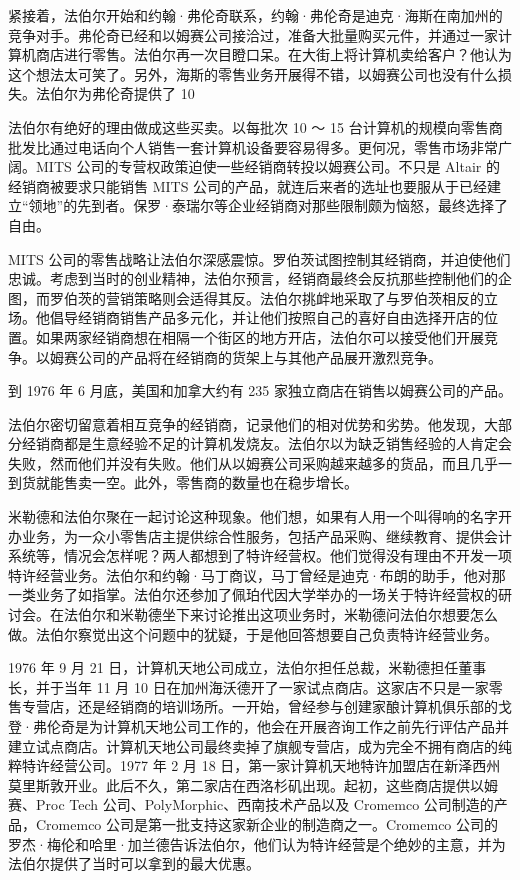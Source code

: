 \documentclass[12pt,UTF8]{ctexbook}
\begin{document}
紧接着，法伯尔开始和约翰·弗伦奇联系，约翰·弗伦奇是迪克·海斯在南加州的竞争对手。弗伦奇已经和以姆赛公司接洽过，准备大批量购买元件，并通过一家计算机商店进行零售。法伯尔再一次目瞪口呆。在大街上将计算机卖给客户？他认为这个想法太可笑了。另外，海斯的零售业务开展得不错，以姆赛公司也没有什么损失。法伯尔为弗伦奇提供了 10%

法伯尔有绝好的理由做成这些买卖。以每批次 10 ～ 15 台计算机的规模向零售商批发比通过电话向个人销售一套计算机设备要容易得多。更何况，零售市场非常广阔。MITS 公司的专营权政策迫使一些经销商转投以姆赛公司。不只是 Altair 的经销商被要求只能销售 MITS 公司的产品，就连后来者的选址也要服从于已经建立“领地”的先到者。保罗·泰瑞尔等企业经销商对那些限制颇为恼怒，最终选择了自由。

MITS 公司的零售战略让法伯尔深感震惊。罗伯茨试图控制其经销商，并迫使他们忠诚。考虑到当时的创业精神，法伯尔预言，经销商最终会反抗那些控制他们的企图，而罗伯茨的营销策略则会适得其反。法伯尔挑衅地采取了与罗伯茨相反的立场。他倡导经销商销售产品多元化，并让他们按照自己的喜好自由选择开店的位置。如果两家经销商想在相隔一个街区的地方开店，法伯尔可以接受他们开展竞争。以姆赛公司的产品将在经销商的货架上与其他产品展开激烈竞争。

到 1976 年 6 月底，美国和加拿大约有 235 家独立商店在销售以姆赛公司的产品。

法伯尔密切留意着相互竞争的经销商，记录他们的相对优势和劣势。他发现，大部分经销商都是生意经验不足的计算机发烧友。法伯尔以为缺乏销售经验的人肯定会失败，然而他们并没有失败。他们从以姆赛公司采购越来越多的货品，而且几乎一到货就能售卖一空。此外，零售商的数量也在稳步增长。

米勒德和法伯尔聚在一起讨论这种现象。他们想，如果有人用一个叫得响的名字开办业务，为一众小零售店主提供综合性服务，包括产品采购、继续教育、提供会计系统等，情况会怎样呢？两人都想到了特许经营权。他们觉得没有理由不开发一项特许经营业务。法伯尔和约翰·马丁商议，马丁曾经是迪克·布朗的助手，他对那一类业务了如指掌。法伯尔还参加了佩珀代因大学举办的一场关于特许经营权的研讨会。在法伯尔和米勒德坐下来讨论推出这项业务时，米勒德问法伯尔想要怎么做。法伯尔察觉出这个问题中的犹疑，于是他回答想要自己负责特许经营业务。

1976 年 9 月 21 日，计算机天地公司成立，法伯尔担任总裁，米勒德担任董事长，并于当年 11 月 10 日在加州海沃德开了一家试点商店。这家店不只是一家零售专营店，还是经销商的培训场所。一开始，曾经参与创建家酿计算机俱乐部的戈登·弗伦奇是为计算机天地公司工作的，他会在开展咨询工作之前先行评估产品并建立试点商店。计算机天地公司最终卖掉了旗舰专营店，成为完全不拥有商店的纯粹特许经营公司。1977 年 2 月 18 日，第一家计算机天地特许加盟店在新泽西州莫里斯敦开业。此后不久，第二家店在西洛杉矶出现。起初，这些商店提供以姆赛、Proc Tech 公司、PolyMorphic、西南技术产品以及 Cromemco 公司制造的产品，Cromemco 公司是第一批支持这家新企业的制造商之一。Cromemco 公司的罗杰·梅伦和哈里·加兰德告诉法伯尔，他们认为特许经营是个绝妙的主意，并为法伯尔提供了当时可以拿到的最大优惠。
\end{document}
